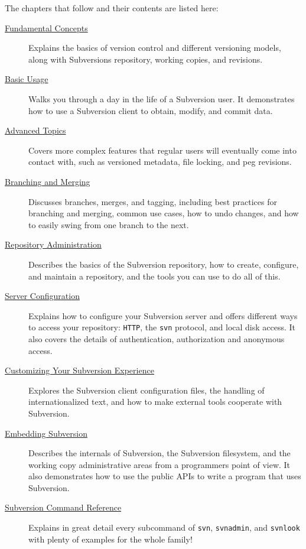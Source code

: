 The chapters that follow and their contents are listed here:

\begin{description}
\item[{\hyperref[svn.basic]{Fundamental Concepts}}]
Explains the basics of version control and different versioning models,
along with Subversion\textquotesingle s repository, working copies, and
revisions.
\item[{\hyperref[svn.tour]{Basic Usage}}]
Walks you through a day in the life of a Subversion user. It
demonstrates how to use a Subversion client to obtain, modify, and
commit data.
\item[{\hyperref[svn.advanced]{Advanced Topics}}]
Covers more complex features that regular users will eventually come
into contact with, such as versioned metadata, file locking, and peg
revisions.
\item[{\hyperref[svn.branchmerge]{Branching and Merging}}]
Discusses branches, merges, and tagging, including best practices for
branching and merging, common use cases, how to undo changes, and how to
easily swing from one branch to the next.
\item[{\hyperref[svn.reposadmin]{Repository Administration}}]
Describes the basics of the Subversion repository, how to create,
configure, and maintain a repository, and the tools you can use to do
all of this.
\item[{\hyperref[svn.serverconfig]{Server Configuration}}]
Explains how to configure your Subversion server and offers different
ways to access your repository: \texttt{HTTP}, the \texttt{svn}
protocol, and local disk access. It also covers the details of
authentication, authorization and anonymous access.
\item[{\hyperref[svn.customization]{Customizing Your Subversion
Experience}}]
Explores the Subversion client configuration files, the handling of
internationalized text, and how to make external tools cooperate with
Subversion.
\item[{\hyperref[svn.developer]{Embedding Subversion}}]
Describes the internals of Subversion, the Subversion filesystem, and
the working copy administrative areas from a
programmer\textquotesingle s point of view. It also demonstrates how to
use the public APIs to write a program that uses Subversion.
\item[{\hyperref[svn.ref]{Subversion Command Reference}}]
Explains in great detail every subcommand of \texttt{svn},
\texttt{svnadmin}, and \texttt{svnlook} with plenty of examples for the
whole family!

\end{description}
